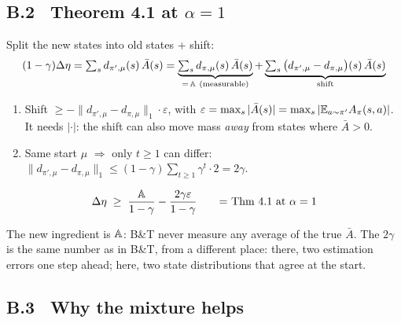 \subsection*{B.2 \ Theorem 4.1 at $\alpha=1$}

Split the new states into old states + shift:
\begin{gather*}
  (1-\gamma)\Delta\eta = \textstyle\sum_s d_{\pi',\mu}(s)\,\bar A(s)
  = \underbrace{\textstyle\sum_s d_{\pi,\mu}(s)\,\bar A(s)}_{=\,\PA\ \text{(measurable)}}
  + \underbrace{\textstyle\sum_s \big(d_{\pi',\mu}-d_{\pi,\mu}\big)(s)\,\bar A(s)}_{\text{shift}}
\end{gather*}
\begin{enumerate}
  \item Shift $\ge -\|d_{\pi',\mu}-d_{\pi,\mu}\|_1\cdot\varepsilon$, with $\varepsilon=\max_s|\bar A(s)|=\max_s|\mathbb{E}_{a\sim\pi'}A_\pi(s,a)|$. It needs $|\cdot|$: the shift can also move mass \emph{away} from states where $\bar A>0$.
  \item Same start $\mu$ $\Rightarrow$ only $t\ge1$ can differ: \ $\|d_{\pi',\mu}-d_{\pi,\mu}\|_1\le(1-\gamma)\sum_{t\ge1}\gamma^t\cdot2=2\gamma$.
\end{enumerate}
\begin{eqbox}
\begin{gather*}
  \Delta\eta \;\ge\; \frac{\mathbb{A}}{1-\gamma} - \frac{2\gamma\varepsilon}{1-\gamma} \qquad \text{= Thm 4.1 at $\alpha=1$}
\end{gather*}
\end{eqbox}
{\small The new ingredient is $\mathbb{A}$: B\&T never measure any average of the true $\bar A$. The $2\gamma$ is the same number as in B\&T, from a different place: there, two estimation errors one step ahead; here, two state distributions that agree at the start.}

\subsection*{B.3 \ Why the mixture helps}

